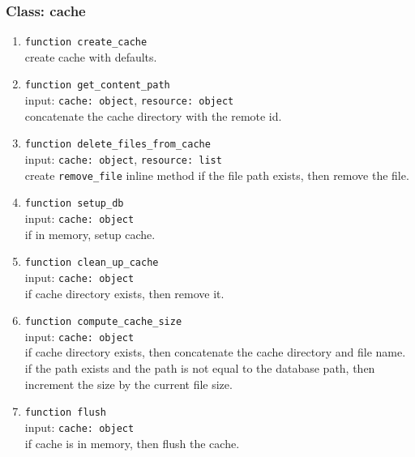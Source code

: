 \subsubsection{Class: cache}
\begin{enumerate}
    \item \verb|function create_cache| \\
    create cache with defaults.
    \item \verb|function get_content_path| \\
    input: \verb|cache: object|, \verb|resource: object| \\
    concatenate the cache directory with the remote id.
    \item \verb|function delete_files_from_cache| \\
    input: \verb|cache: object|, \verb|resource: list| \\
    create \verb|remove_file| inline method
    if the file path exists, then remove the file.
    \item \verb|function setup_db| \\
    input: \verb|cache: object| \\
    if in memory, setup cache.
    \item \verb|function clean_up_cache| \\
    input: \verb|cache: object| \\
    if cache directory exists, then remove it.
    \item \verb|function compute_cache_size| \\
    input: \verb|cache: object| \\
    if cache directory exists, then concatenate the cache directory and file name. \\
    if the path exists and the path is not equal to the database path, then increment the size by the current file size.
    \item \verb|function flush| \\
    input: \verb|cache: object| \\
    if cache is in memory, then flush the cache. 
\end{enumerate}

